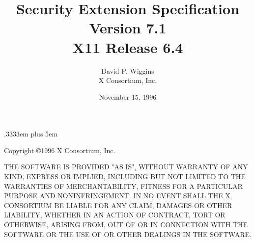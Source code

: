 \newenvironment{eerror}[1]{\begin{keeptogether} \encodingsection{#1} \begin{tabbing} \etabstops }{\end{tabbing} \end{keeptogether}}

\newenvironment{etypedef}[1]{\begin{keeptogether} \typename{#1} \begin{tabbing} \etabstops }{\end{tabbing} \end{keeptogether}}

\newcommand{\cfunctionname}[1]{\mbox{\tt #1}}
\newcommand{\cfunctiondecl}[1]{\mbox{\rm #1}}
\newcommand{\cargdecl}[2]{\penalty -1\typename{#1} \argname{#2}}
\newenvironment{cfunction}[2]{\begin{sloppypar}\begin{keeptogether}\vspace{5mm}\typename{#1}\\ \cfunctiondecl{#2}\ (}{)\end{keeptogether}\end{sloppypar}{\hangafter=2 \hangindent=20pt \raggedright\par}}

\spaceskip .3333em plus 5em



\title{Security Extension Specification\\Version 7.1\\X11 Release 6.4}
\author{David P. Wiggins\\X Consortium, Inc.}
\date{November 15, 1996}
\maketitle
\thispagestyle{empty}

\eject

Copyright \copyright 1996 X Consortium, Inc.

THE SOFTWARE IS PROVIDED "AS IS", WITHOUT WARRANTY OF ANY KIND,
EXPRESS OR IMPLIED, INCLUDING BUT NOT LIMITED TO THE WARRANTIES OF
MERCHANTABILITY, FITNESS FOR A PARTICULAR PURPOSE AND NONINFRINGEMENT.
IN NO EVENT SHALL THE X CONSORTIUM BE LIABLE FOR ANY CLAIM, DAMAGES OR
OTHER LIABILITY, WHETHER IN AN ACTION OF CONTRACT, TORT OR OTHERWISE,
ARISING FROM, OUT OF OR IN CONNECTION WITH THE SOFTWARE OR THE USE OF
OR OTHER DEALINGS IN THE SOFTWARE.

